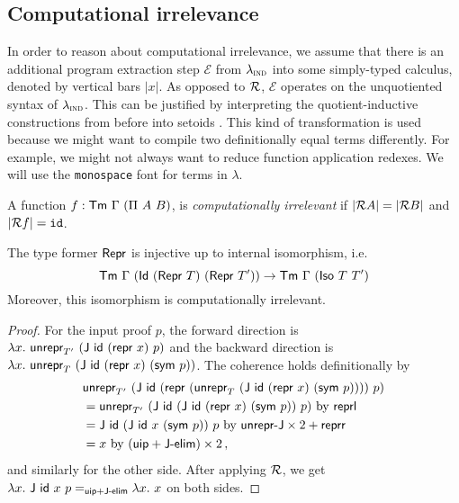 \subsection{Computational irrelevance}\label{sub:irr}

In order to reason about computational irrelevance, we assume that there is
an additional program extraction step $\mathcal{E}$ from $\lambda_{\textsc{ind}}$ into some
simply-typed calculus, denoted by vertical bars $|x|$. As opposed to
$\mathcal{R}$, $\mathcal{E}$ operates on the unquotiented syntax of $\lambda_{\textsc{ind}}$. This
can be justified by interpreting the quotient-inductive constructions from
before into setoids \cite{Kovacs2022-vb}. This kind of transformation is used
because we might want to compile two definitionally equal terms differently. For
example, we might not always want to reduce function application redexes. We
will use the \texttt{monospace} font for terms in $\lambda$.

\begin{definition}
    A function $f : \mta{Tm}\ \Gamma\ (\Pi\ A\ B)$, is \emph{computationally irrelevant} if
    $|\mathcal{R} A| = |\mathcal{R} B|$ and $|\mathcal{R} f| = \texttt{id}$.
\end{definition}

\begin{theorem}
	The type former $\textsf{Repr}{}$ is injective up to internal isomorphism, i.e.
	\begin{equation}
	\Tm\ \Gamma\ (\mta{Id}\ (\mta{Repr}\ T)\ (\mta{Repr}\ T')) \to \Tm\ \Gamma\ (\mta{Iso}\ T\ T')
	\end{equation}
	Moreover, this isomorphism is computationally irrelevant.
	\begin{proof}
	For the input proof $p$, the forward direction is
	$\lambda x.\ \Munrepr_{T'}\ (\mta{J}\ \mta{id}\ (\Mrepr\ x)\ p)$
	and the backward direction is
	$\lambda x.\ \Munrepr_{T}\ (\mta{J}\ \mta{id}\ (\Mrepr\ x)\ (\mta{sym}\
	p))$. The coherence holds definitionally by
    \begin{align*}
	&\Munrepr_{T'}\ (\mta{J}\ \mta{id}\ (\Mrepr\ (\Munrepr_{T}\ (\mta{J}\ \mta{id}\ (\Mrepr\ x)\ (\mta{sym}\ p))))\ p) \\
	&= \Munrepr_{T'}\ (\mta{J}\ \mta{id}\ (\mta{J}\ \mta{id}\ (\Mrepr\ x)\ (\mta{sym}\ p))\ p) \text{ by }{\mta{reprl}} \\
    &= \mta{J}\ \mta{id}\ (\mta{J}\ \mta{id}\ x\ (\mta{sym}\ p))\ p \text{ by }{\mta{unrepr-J}\times 2 + \mta{reprr}} \\
    &= x \text{ by }{(\mta{uip} + \mta{J-elim})\times2} \,,
    \end{align*}
	and similarly for the other side. After applying $\mathcal{R}$, we get $\lambda x.\
	\mta{J}\ \mta{id}\ x\ p =_{\mta{uip}+\mta{J-elim}} \lambda x.\ x$ on both sides.
	\end{proof}
\end{theorem}


